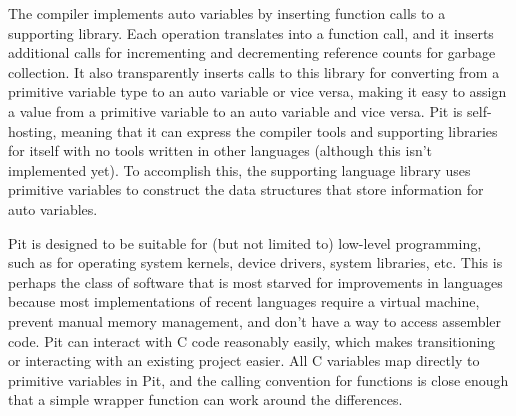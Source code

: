 The compiler implements auto variables by inserting function calls to a supporting library.  Each operation translates
into a function call, and it inserts additional calls for incrementing and decrementing reference counts for garbage
collection.  It also transparently inserts calls to this library for converting from a primitive variable type to an
auto variable or vice versa, making it easy to assign a value from a primitive variable to an auto variable and vice
versa.  Pit is self-hosting, meaning that it can express the compiler tools and supporting libraries for itself with no
tools written in other languages (although this isn't implemented yet).  To accomplish this, the supporting language
library uses primitive variables to construct the data structures that store information for auto variables.

Pit is designed to be suitable for (but not limited to) low-level programming, such as for operating system kernels,
device drivers, system libraries, etc.  This is perhaps the class of software that is most starved for improvements in
languages because most implementations of recent languages require a virtual machine, prevent manual memory management,
and don't have a way to access assembler code.  Pit can interact with C code reasonably easily, which makes
transitioning or interacting with an existing project easier.  All C variables map directly to primitive variables in
Pit, and the calling convention for functions is close enough that a simple wrapper function can work around the
differences.
